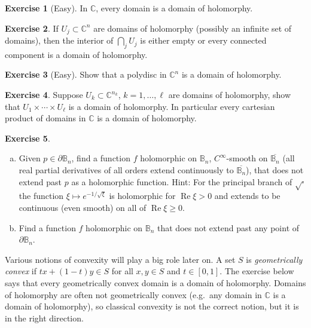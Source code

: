 \documentclass[12pt,openany]{book}
\renewcommand{\Re}{\operatorname{Re}}
\newcommand{\C}{{\mathbb{C}}}
\newcommand{\bB}{{\mathbb{B}}}
\newcommand{\myindex}[1]{#1\index{#1}}
\theoremstyle{plain}
\theoremstyle{remark}
\theoremstyle{definition}
\newenvironment{exbox}{%
    \def\FrameCommand{\vrule width 1pt \relax\hspace{10pt}}%
    \MakeFramed{\advance\hsize-\width\FrameRestore}%
}{%
    \endMakeFramed
}
\newenvironment{exparts}{%
    \leavevmode\begin{enumerate}[a),noitemsep,topsep=0pt,parsep=0pt,partopsep=0pt]
}{%
    \end{enumerate}
}
\theoremstyle{exercise}
\newtheorem{exercise}{Exercise}[section]
\theoremstyle{example}
\begin{document}
\begin{exbox}
\begin{exercise}[Easy]
In $\C$, every domain is a domain of holomorphy.
\end{exercise}

\begin{exercise}
If $U_j \subset \C^n$ are domains of holomorphy (possibly an infinite set of
domains), then the interior of
$\bigcap_{j} U_j$
is either empty or every connected component is a domain of holomorphy.
\end{exercise}

\begin{exercise}[Easy]
Show that a polydisc in $\C^n$ is a domain of holomorphy.
\end{exercise}

\begin{exercise}
Suppose $U_k \subset \C^{n_k}$, $k=1,\ldots,\ell$ are domains of holomorphy,
show that
$U_1 \times \cdots \times U_\ell$ is a domain of holomorphy.
In particular every cartesian product of domains in $\C$ is a domain of
holomorphy.
\end{exercise}

\begin{exercise}
\begin{exparts}
\item
Given $p \in \partial \bB_n$, find a function $f$ holomorphic on
$\bB_n$,
$C^\infty$-smooth on $\overline{\bB_n}$ (all real partial derivatives of
all orders extend
continuously to $\overline{\bB_n}$), that does not extend past $p$
as a holomorphic function.
Hint: For the principal branch of $\sqrt{\cdot}$ the function $\xi \mapsto
e^{-1/\sqrt{\xi}}$ is holomorphic for $\Re \xi > 0$ and extends to
be continuous (even smooth) on all of $\Re \xi \geq 0$.
\item
Find a function $f$ holomorphic on $\bB_n$
that does not extend past any point of
$\partial \bB_n$.
\end{exparts}
\end{exercise}
\end{exbox}

Various notions of convexity will play a big role later on.
A set $S$ is \emph{\myindex{geometrically convex}}
if $t x + (1-t)y \in S$ 
for all $x,y \in S$ and $t \in [0,1]$.
The exercise below
says that every geometrically convex domain is a domain of holomorphy.
Domains of holomorphy are often not geometrically convex
(e.g.\ any domain in $\C$ is a domain of holomorphy),
so classical convexity is not the correct notion, but it is
in the right direction.
\end{document}
